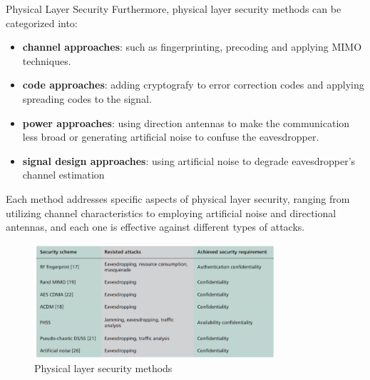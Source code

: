 \begin{section}{Physical Layer Security}
  Furthermore, physical layer security methods can be categorized into:
  \begin{itemize}
    \item \textbf{channel approaches}: such as fingerprinting, precoding and applying MIMO techniques.
    \item \textbf{code approaches}: adding cryptografy to error correction codes and applying spreading
      codes to the signal.
    \item \textbf{power approaches}: using direction antennas to make the communication less broad 
      or generating artificial noise to confuse the eavesdropper.
    \item \textbf{signal design approaches}: using artificial noise to degrade eavesdropper's 
      channel estimation
  \end{itemize}

  Each method addresses specific aspects of physical layer security, ranging from utilizing
  channel characteristics to employing artificial noise and directional antennas, and each one 
  is effective against different types of attacks.
  \begin{figure}[H]
    \centering
    \includegraphics[width=0.8\textwidth]{img/wireless/physical layer security schema.png}
    \caption{Physical layer security methods}
    \label{fig:physical_layer_security_schema}
  \end{figure}

\end{section}

